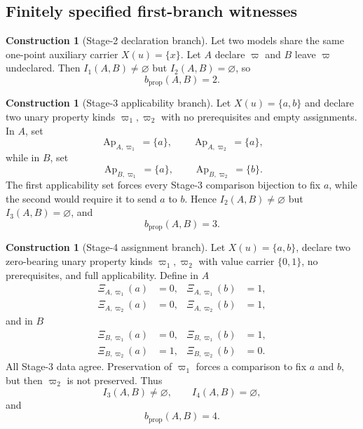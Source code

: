 \documentclass[11pt]{article}
\newcommand{\Ap}{\operatorname{Ap}}
\theoremstyle{definition}
\newtheorem{construction}[theorem]{Construction}
\theoremstyle{remark}
\begin{document}
\subsection{Finitely specified first-branch witnesses}

\begin{construction}[Stage-2 declaration branch]
Let two models share the same one-point auxiliary carrier \(X(u)=\{x\}\).
Let \(A\) declare \(\varpi\) and \(B\) leave \(\varpi\) undeclared.
Then \(I_1(A,B)\neq\varnothing\) but \(I_2(A,B)=\varnothing\), so
\[
b_{\mathrm{prop}}(A,B)=2.
\]
\end{construction}

\begin{construction}[Stage-3 applicability branch]
Let \(X(u)=\{a,b\}\) and declare two unary property kinds \(\varpi_1,\varpi_2\) with no prerequisites and empty assignments.
In \(A\), set
\[
\Ap_{A,\varpi_1}=\{a\},
\qquad
\Ap_{A,\varpi_2}=\{a\},
\]
while in \(B\), set
\[
\Ap_{B,\varpi_1}=\{a\},
\qquad
\Ap_{B,\varpi_2}=\{b\}.
\]
The first applicability set forces every Stage-3 comparison bijection to fix \(a\), while the second would require it to send \(a\) to \(b\).
Hence \(I_2(A,B)\neq\varnothing\) but \(I_3(A,B)=\varnothing\), and
\[
b_{\mathrm{prop}}(A,B)=3.
\]
\end{construction}

\begin{construction}[Stage-4 assignment branch]
Let \(X(u)=\{a,b\}\), declare two zero-bearing unary property kinds \(\varpi_1,\varpi_2\) with value carrier \(\{0,1\}\), no prerequisites, and full applicability.
Define in \(A\)
\[
\begin{aligned}
\Xi_{A,\varpi_1}(a)&=0,&\Xi_{A,\varpi_1}(b)&=1,\\
\Xi_{A,\varpi_2}(a)&=0,&\Xi_{A,\varpi_2}(b)&=1,
\end{aligned}
\]
and in \(B\)
\[
\begin{aligned}
\Xi_{B,\varpi_1}(a)&=0,&\Xi_{B,\varpi_1}(b)&=1,\\
\Xi_{B,\varpi_2}(a)&=1,&\Xi_{B,\varpi_2}(b)&=0.
\end{aligned}
\]
All Stage-3 data agree.
Preservation of \(\varpi_1\) forces a comparison to fix \(a\) and \(b\), but then \(\varpi_2\) is not preserved.
Thus
\[
I_3(A,B)\neq\varnothing,
\qquad
I_4(A,B)=\varnothing,
\]and
\[
b_{\mathrm{prop}}(A,B)=4.
\]
\end{construction}
\end{document}
